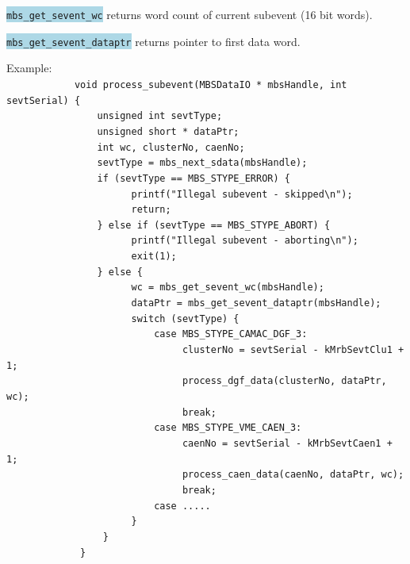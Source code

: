 \documentclass[10pt]{article}
\newcommand{\blue}[1]{\colorbox{lightblue}{\texttt{#1}}}
\newenvironment{yellowboxed}
	{\begin{Sbox}\begin{minipage}[t]}
	{\end{minipage}\end{Sbox}\colorbox{yellow}{\TheSbox}}
\begin{document}
\blue{mbs\_get\_sevent\_wc} returns word count of current subevent (16 bit words).

\blue{mbs\_get\_sevent\_dataptr} returns pointer to first data word.
\vspace{5mm}

\begin{yellowboxed}{\linewidth}
Example:\\
\verb+            void process_subevent(MBSDataIO * mbsHandle, int sevtSerial) {+\\
\verb+                unsigned int sevtType;+\\
\verb+                unsigned short * dataPtr;+\\
\verb+                int wc, clusterNo, caenNo;+\\
\verb+                sevtType = mbs_next_sdata(mbsHandle);+\\
\verb+                if (sevtType == MBS_STYPE_ERROR) {+\\
\verb+                      printf("Illegal subevent - skipped\n");+\\
\verb+                      return;+\\
\verb+                } else if (sevtType == MBS_STYPE_ABORT) {+\\
\verb+                      printf("Illegal subevent - aborting\n");+\\
\verb+                      exit(1);+\\
\verb+                } else {+\\
\verb+                      wc = mbs_get_sevent_wc(mbsHandle);+\\
\verb+                      dataPtr = mbs_get_sevent_dataptr(mbsHandle);+\\
\verb+                      switch (sevtType) {+\\
\verb+                          case MBS_STYPE_CAMAC_DGF_3:+\\
\verb.                               clusterNo = sevtSerial - kMrbSevtClu1 + 1;.\\
\verb+                               process_dgf_data(clusterNo, dataPtr, wc);+\\
\verb+                               break;+\\
\verb+                          case MBS_STYPE_VME_CAEN_3:+\\
\verb.                               caenNo = sevtSerial - kMrbSevtCaen1 + 1;.\\
\verb+                               process_caen_data(caenNo, dataPtr, wc);+\\
\verb+                               break;+\\
\verb+                          case .....+\\
\verb+                      }+\\
\verb+                 }+\\
\verb+             }+
\end{yellowboxed}
\vspace{5mm}
\end{document}
